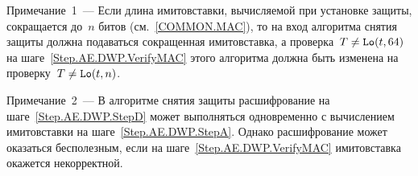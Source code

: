 \vskip6pt

\begin{note}
Примечание~1~--- Если длина имитовставки, вычисляемой при установке защиты, 
сокращается до~$n$ битов (см.~\ref{COMMON.MAC}), то на вход алгоритма снятия 
защиты должна подаваться сокращенная имитовставка, а проверка~$T\neq\mathop{\texttt{Lo}}\nolimits(t,64)$ 
на шаге~\ref{Step.AE.DWP.VerifyMAC} этого алгоритма должна быть изменена на 
проверку~$T\neq\mathop{\texttt{Lo}}\nolimits(t,n)$.
\end{note}

\vskip6pt

\begin{note}
Примечание~2~--- В алгоритме снятия защиты расшифрование на 
шаге~\ref{Step.AE.DWP.StepD} может выполняться одновременно 
с вычислением имитовставки на шаге~\ref{Step.AE.DWP.StepA}. 
Однако расшифрование может оказаться бесполезным, если на 
шаге~\ref{Step.AE.DWP.VerifyMAC} имитовставка окажется некорректной.
\end{note}